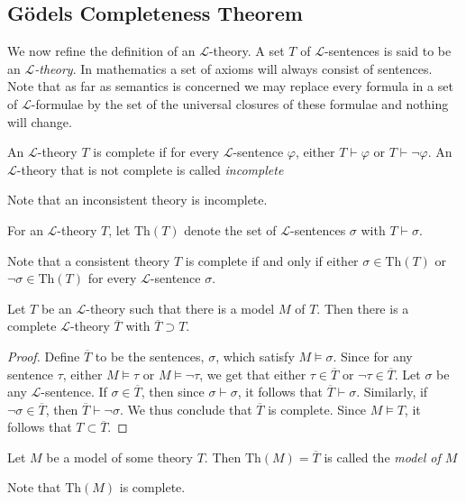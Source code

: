 \subsection{Gödels Completeness Theorem}
We now refine the definition of an $\mathcal{L}$-theory. A set $T$ of $\mathcal{L}$-sentences is said to be an \emph{$\mathcal{L}$-theory}. In mathematics a set of axioms will always consist of sentences. Note that as far as semantics is concerned we may replace every formula in a set of $\mathcal{L}$-formulae by the set of the universal closures of these formulae and nothing will change. 
\begin{definition}
    An $\mathcal{L}$-theory $T$ is complete if for every $\mathcal{L}$-sentence $\varphi$, either $T \vdash \varphi$ or $T \vdash \neg\varphi$. An $\mathcal{L}$-theory that is not complete is called \emph{incomplete}
\end{definition}
\begin{remark}
    Note that an inconsistent theory is incomplete. 
\end{remark}
\begin{definition}
    For an $\mathcal{L}$-theory $T$, let $\mathrm{Th}(T)$ denote the set of $\mathcal{L}$-sentences $\sigma$ with $T\vdash \sigma$.
\end{definition}
\begin{remark}
    Note that a consistent theory $T$ is complete if and only if either $\sigma\in \mathrm{Th}(T)$ or $\neg \sigma \in\mathrm{Th}(T)$ for every $\mathcal{L}$-sentence $\sigma$.  
\end{remark}
\begin{theorem}
    Let $T$ be an $\mathcal{L}$-theory such that there is a model $M$ of $T$. Then there is a complete $\mathcal{L}$-theory $\overline{T}$ with $\overline{T}\supset T$. 
\end{theorem}
\begin{proof}
    Define $\overline{T}$ to be the sentences, $\sigma$, which satisfy $M\vDash \sigma$. Since for any sentence $\tau$, either $M\vDash \tau$ or $M\vDash \neg\tau$, we get that either $\tau\in \overline{T}$ or $\neg \tau\in \overline{T}$. Let $\sigma$ be any $\mathcal{L}$-sentence. If $\sigma\in \overline{T}$, then since $\sigma\vdash \sigma$, it follows that $\overline{T}\vdash \sigma$. Similarly, if $\neg\sigma\in \overline{T}$, then $\overline{T} \vdash \neg\sigma$. We thus conclude that $\overline{T}$ is complete. Since $M\vDash T$, it follows that $T\subset \overline{T}$.
\end{proof}
\begin{definition}
    Let $M$ be a model of some theory $T$. Then $\mathrm{Th}(M)=\overline{T}$ is called the \emph{model of $M$} 
\end{definition}
\begin{remark}
    Note that $\mathrm{Th}(M)$ is complete.
\end{remark}

